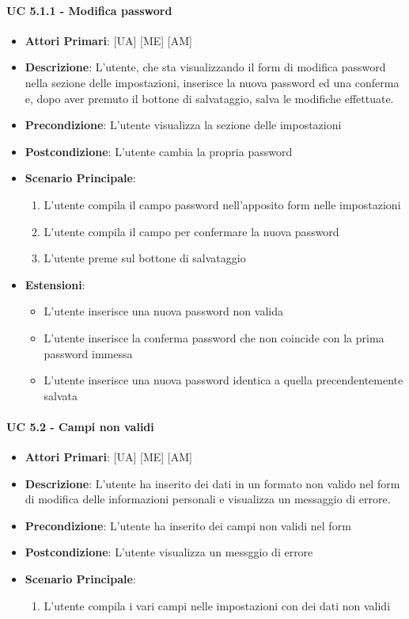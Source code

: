 		\paragraph{UC 5.1.1 - Modifica password}
			\begin{itemize}
				\item \textbf{Attori Primari}: [UA] [ME] [AM]
				\item \textbf{Descrizione}: L'utente, che sta visualizzando il form di modifica password nella sezione delle impostazioni, inserisce la nuova password ed una conferma e, dopo aver premuto il bottone di salvataggio, salva le modifiche effettuate.
				\item \textbf{Precondizione}: L'utente visualizza la sezione delle impostazioni
				\item \textbf{Postcondizione}: L'utente cambia la propria password
				\item \textbf{Scenario Principale}:
				\begin{enumerate}
					\item{L'utente compila il campo password nell'apposito form nelle impostazioni}
					\item{L'utente compila il campo per confermare la nuova password}
					\item{L'utente preme sul bottone di salvataggio}
				\end{enumerate}	
				\item \textbf{Estensioni}:
					\begin{itemize}
						\item L'utente inserisce una nuova password non valida
						\item L'utente inserisce la conferma password che non coincide con la prima password immessa
						\item L'utente inserisce una nuova password identica a quella precendentemente salvata
					\end{itemize}
			\end{itemize}

			
			\paragraph{UC 5.2 - Campi non validi}
			\begin{itemize}
				\item \textbf{Attori Primari}: [UA] [ME] [AM]
				\item \textbf{Descrizione}: L'utente ha inserito dei dati in un formato non valido nel form di modifica delle informazioni personali e visualizza un messaggio di errore.
				\item \textbf{Precondizione}: L'utente ha inserito dei campi non validi nel form
				\item \textbf{Postcondizione}: L'utente visualizza un messggio di errore 
				\item \textbf{Scenario Principale}:
				\begin{enumerate}
					\item{L'utente compila i vari campi nelle impostazioni con dei dati non validi}
				\end{enumerate}	
			\end{itemize}

